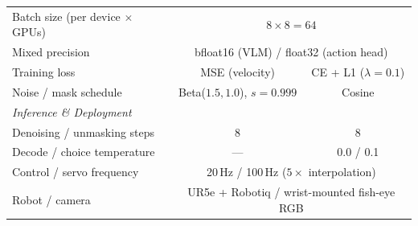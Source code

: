 \documentclass{article}
\begin{document}
\begin{table}[h]
\begin{tabular}{lcc}
Batch size (per device $\times$ GPUs) & \multicolumn{2}{c}{$8 \times 8 = 64$} \\
Mixed precision & \multicolumn{2}{c}{bfloat16 (VLM) / float32 (action head)} \\
Training loss & MSE (velocity) & CE + L1 ($\lambda{=}0.1$) \\
Noise / mask schedule & Beta($1.5, 1.0$), $s{=}0.999$ & Cosine \\
\midrule
\multicolumn{3}{l}{\textit{Inference \& Deployment}} \\
Denoising / unmasking steps & 8 & 8 \\
Decode / choice temperature & --- & 0.0 / 0.1 \\
Control / servo frequency & \multicolumn{2}{c}{20\,Hz / 100\,Hz ($5\times$ interpolation)} \\
Robot / camera & \multicolumn{2}{c}{UR5e + Robotiq / wrist-mounted fish-eye RGB} \\
\bottomrule
\end{tabular}
\end{table}
\end{document}
